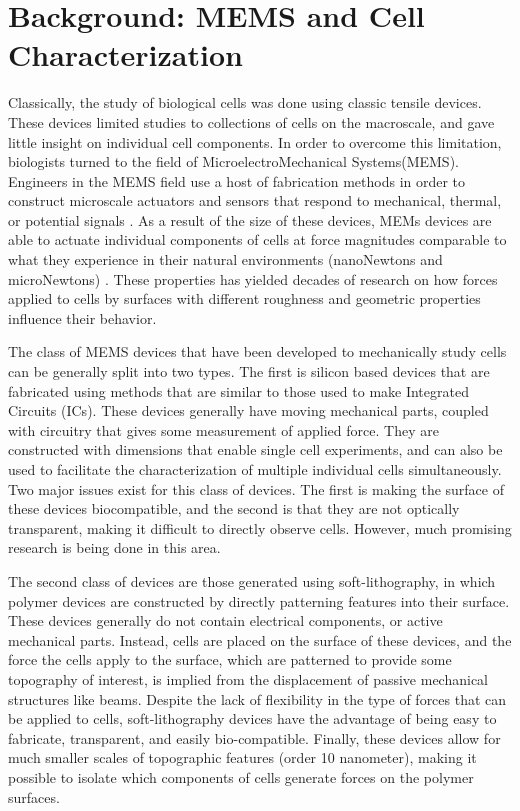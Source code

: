\section{Background: MEMS and Cell Characterization}
Classically, the study of biological cells was done using classic tensile devices\cite{Frisen1969,Kempson1973,Parodi1972}. These devices limited studies to collections of cells on the macroscale, and gave little insight on individual cell components. In order to overcome this limitation, biologists turned to the field of MicroelectroMechanical Systems(MEMS). Engineers in the MEMS field use a host of fabrication methods in order to construct microscale actuators and sensors that respond to mechanical, thermal, or potential signals \cite{Whitesides2001}. As a result of the size of these devices, MEMs devices are able to actuate individual components of cells at force magnitudes comparable to what they experience in their natural environments (nanoNewtons and microNewtons) \cite{Folch2000,Nianzhen2003,Vilet2003}. These properties has yielded decades of research on how forces applied to cells by surfaces with different roughness and geometric properties influence their behavior. 

The class of MEMS devices that have been developed to mechanically study cells can be generally split into two types. The first is silicon based devices that are fabricated using methods that are similar to those used to make Integrated Circuits (ICs). These devices generally have moving mechanical parts, coupled with circuitry that gives some measurement of applied force. They are constructed with dimensions that enable single cell experiments, and can also be used to facilitate the characterization of multiple individual cells simultaneously. Two major issues exist for this class of devices. The first is making the surface of these devices biocompatible, and the second is that they are not optically transparent, making it difficult to directly observe cells. However, much promising research is being done in this area. 

The second class of devices are those generated using soft-lithography, in which polymer devices are constructed by directly patterning features into their surface. These devices generally do not contain electrical components, or active mechanical parts. Instead, cells are placed on the surface of these devices, and the force the cells apply to the surface, which are patterned to provide some topography of interest, is implied from the displacement of passive mechanical structures like beams. Despite the lack of flexibility in the type of forces that can be applied to cells, soft-lithography devices have the advantage of being easy to fabricate, transparent, and easily bio-compatible. Finally, these devices allow for much smaller scales of topographic features (order 10 nanometer), making it possible to isolate which components of cells generate forces on the polymer surfaces.

